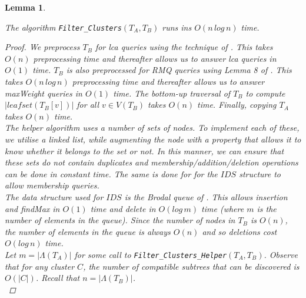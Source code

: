 \documentclass{article}
\newcommand{\leafset}{\Lambda}
\newtheorem{filterclustersruntime}[incompatibility]{Lemma}
\begin{document}
    \begin{filterclustersruntime}
        \label{lem:filterclustersruntime}

        The algorithm \texttt{Filter\_Clusters}$(T_A, T_B)$ runs ins $O(n\,log\,n)$ time.

        \begin{proof}
            We preprocess $T_B$ for \textit{lca} queries using the technique of \cite{bender2000lca}. This takes $O(n)$ preprocessing time and thereafter allows us to answer \textit{lca} queries in $O(1)$ time. $T_B$ is also preprocessed for RMQ queries using Lemma 8 of \cite{jansson2018algorithms}. This takes $O(n\,log\,n)$ preprocessing time and thereafter allows us to answer \textit{maxWeight} queries in $O(1)$ time. The bottom-up traversal of $T_B$ to compute $|leafset(T_B[v])|$ for all $v \in V(T_B)$ takes $O(n)$ time. Finally, copying $T_A$ takes $O(n)$ time.\\

            The helper algorithm uses a number of sets of nodes. To implement each of these, we utilise a linked list, while augmenting the node with a property that allows it to know whether it belongs to the set or not. In this manner, we can ensure that these sets do not contain duplicates and membership/addition/deletion operations can be done in constant time. The same is done for for the $IDS$ structure to allow membership queries.\\

            The data structure used for $IDS$ is the Brodal queue of \cite{brodal1995fast}. This allows insertion and findMax in $O(1)$ time and delete in $O(log\,m)$ time (where $m$ is the number of elements in the queue). Since the number of nodes in $T_B$ is $O(n)$, the number of elements in the queue is always $O(n)$ and so deletions cost $O(log\,n)$ time.\\

            Let $m = |\leafset(T_A)|$ for some call to \texttt{Filter\_Clusters\_Helper}$(T_A, T_B)$. Observe that for any cluster $C$, the number of compatible subtrees that can be discovered is $O(|C|)$. Recall that $n = |\leafset(T_B)|$.\\


\end{proof}
\end{filterclustersruntime}
\end{document}
